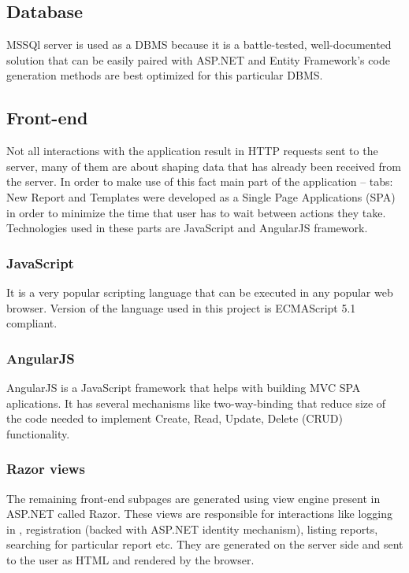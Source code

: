 \documentclass[12pt, twoside, openany]{report}
\theoremstyle{definition}
\begin{document}
\subsection{Database}
MSSQl server is used as a DBMS because it is a battle-tested, well-documented solution that can be easily paired with ASP.NET and Entity Framework's code generation methods are best optimized for this particular DBMS. 

\subsection{Front-end}
Not all interactions with the application result in HTTP requests sent to the server, many of them are about shaping data that has already been received from the server. In order to make use of this fact main part of the application -- tabs: New Report and Templates were developed as a Single Page Applications (SPA) in order to minimize the time that user has to wait between actions they take. Technologies used in these parts are JavaScript and AngularJS framework. 

\subsubsection{JavaScript}
It is a very popular scripting language that can be executed in any popular web browser. Version of the language used in this project is ECMAScript 5.1 compliant. 
\subsubsection{AngularJS}
AngularJS is a JavaScript framework that helps with building MVC SPA aplications. It has several mechanisms like two-way-binding that reduce size of the code needed to implement Create, Read, Update, Delete (CRUD) functionality.


\subsubsection{Razor views}
The remaining front-end subpages are generated using view engine present in ASP.NET called Razor. These views are responsible for interactions like logging in , registration (backed with ASP.NET identity mechanism), listing reports, searching for particular report etc. They are generated on the server side and sent to the user as HTML and rendered by the browser.
 
\end{document}
